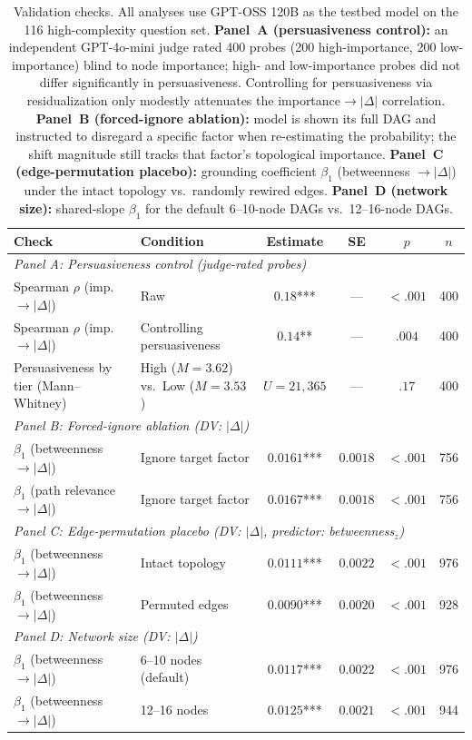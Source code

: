 \begin{table}[t]
\centering
\small
\caption{Validation checks. All analyses use GPT-OSS 120B as the testbed model on the 116 high-complexity question set. \textbf{Panel~A (persuasiveness control):} an independent GPT-4o-mini judge rated 400 probes (200 high-importance, 200 low-importance) blind to node importance; high- and low-importance probes did not differ significantly in persuasiveness. Controlling for persuasiveness via residualization only modestly attenuates the importance$\rightarrow |\Delta|$ correlation. \textbf{Panel~B (forced-ignore ablation):} model is shown its full DAG and instructed to disregard a specific factor when re-estimating the probability; the shift magnitude still tracks that factor's topological importance. \textbf{Panel~C (edge-permutation placebo):} grounding coefficient $\beta_1$ (betweenness $\rightarrow |\Delta|$) under the intact topology vs.\ randomly rewired edges. \textbf{Panel~D (network size):} shared-slope $\beta_1$ for the default 6--10-node DAGs vs.\ 12--16-node DAGs.}
\label{tab:validation_summary}
\begin{tabular}{llcccc}
\toprule
\textbf{Check} & \textbf{Condition} & \textbf{Estimate} & \textbf{SE} & \textbf{$p$} & \textbf{$n$} \\
\midrule
\multicolumn{6}{l}{\textit{Panel A: Persuasiveness control (judge-rated probes)}} \\
Spearman $\rho$ (imp. $\rightarrow |\Delta|$) & Raw & $0.18$*** & --- & $<.001$ & 400 \\
Spearman $\rho$ (imp. $\rightarrow |\Delta|$) & Controlling persuasiveness & $0.14$** & --- & $.004$ & 400 \\
Persuasiveness by tier (Mann--Whitney) & High ($M=3.62$) vs.\ Low ($M=3.53$) & $U=21{,}365$ & --- & $.17$ & 400 \\
\midrule
\multicolumn{6}{l}{\textit{Panel B: Forced-ignore ablation (DV: $|\Delta|$)}} \\
$\beta_1$ (betweenness $\rightarrow |\Delta|$) & Ignore target factor & $0.0161$*** & $0.0018$ & $<.001$ & 756 \\
$\beta_1$ (path relevance $\rightarrow |\Delta|$) & Ignore target factor & $0.0167$*** & $0.0018$ & $<.001$ & 756 \\
\midrule
\multicolumn{6}{l}{\textit{Panel C: Edge-permutation placebo (DV: $|\Delta|$, predictor: betweenness$_z$)}} \\
$\beta_1$ (betweenness $\rightarrow |\Delta|$) & Intact topology & $0.0111$*** & $0.0022$ & $<.001$ & 976 \\
$\beta_1$ (betweenness $\rightarrow |\Delta|$) & Permuted edges & $0.0090$*** & $0.0020$ & $<.001$ & 928 \\
\midrule
\multicolumn{6}{l}{\textit{Panel D: Network size (DV: $|\Delta|$)}} \\
$\beta_1$ (betweenness $\rightarrow |\Delta|$) & 6--10 nodes (default) & $0.0117$*** & $0.0022$ & $<.001$ & 976 \\
$\beta_1$ (betweenness $\rightarrow |\Delta|$) & 12--16 nodes & $0.0125$*** & $0.0021$ & $<.001$ & 944 \\
\bottomrule
\end{tabular}
\end{table}

